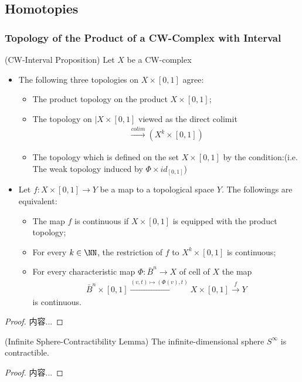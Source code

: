 \documentclass[Total.tex]{subfiles}
\begin{document}
	\subsection{Homotopies}
	\subsubsection{Topology of the Product of a CW-Complex with Interval}
	\begin{proposition}
		(CW-Interval Proposition) Let $X$ be a CW-complex
		\begin{itemize}
			\item The following three topologies on $X\times [0,1]$ agree:
			\begin{itemize}
				\item The product topology on the product $X\times [0,1]$;
				\item The topology on $|X\times [0,1]$ viewed as the direct colimit
				\begin{gather*}
					\stackrel{colim}{\rightarrow} (X^k\times [0,1])
				\end{gather*}
				\item The topology which is defined on the set $X\times [0,1]$ by the condition:(i.e. The weak topology induced by $\Phi\times id_{[0,1]}$)
			\end{itemize}
			\item Let $f:X\times [0,1]\rightarrow Y$ be a map to a topological space $Y$. The followings are equivalent:
			\begin{itemize}
				\item The map $f$ is continuous if $X\times [0,1]$ is equipped with the product topology;
				\item For every $k\in \NN$, the restriction of $f$ to $X^k\times [0,1]$ is continuous;
				\item For every characteristic map $\Phi:\bar{B}^n\rightarrow X$ of cell of $X$ the map
				\begin{gather*}
					\bar{B}^n\times [0,1]\stackrel{(v,t)\mapsto (\Phi(v),t)}{\rightarrow}X\times [0,1]\stackrel{f}{\rightarrow} Y
				\end{gather*}
				is continuous.
			\end{itemize}
		\end{itemize}
	\end{proposition}
	\begin{proof}
		内容...
	\end{proof}
	\begin{lemma}
		(Infinite Sphere-Contractibility Lemma) The infinite-dimensional sphere $S^\infty$ is contractible.
	\end{lemma}
	\begin{proof}
		内容...
	\end{proof}
\end{document}
